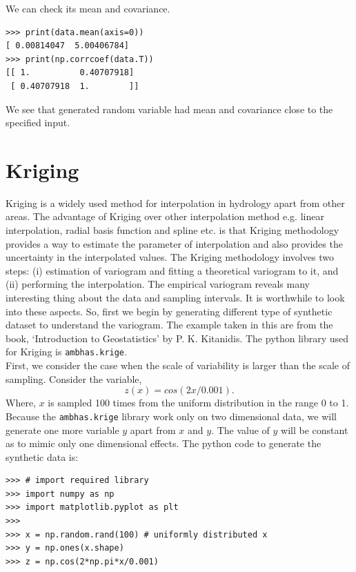 \documentclass[10pt]{book}
\begin{document}
We can check its mean and covariance.
\beforeverb \begin{verbatim}
>>> print(data.mean(axis=0))
[ 0.00814047  5.00406784]
>>> print(np.corrcoef(data.T))
[[ 1.          0.40707918]
 [ 0.40707918  1.        ]]
\end{verbatim} \afterverb
We see that generated random variable had mean and covariance close to the specified input. 


\section{Kriging}
Kriging is a widely used method for interpolation in hydrology apart from other areas. The advantage of Kriging over other interpolation method e.g. linear interpolation, radial basis function and  spline etc. is that Kriging methodology provides a way to estimate the parameter of interpolation and also provides the uncertainty in the interpolated values. The Kriging methodology involves two steps: (i) estimation of variogram and fitting a theoretical variogram to it, and (ii) performing the interpolation. The empirical variogram reveals many interesting thing about the data and sampling intervals. It is worthwhile to look into these aspects. So, first we begin by generating different type of synthetic dataset to understand the variogram. The example taken in this are from the book, `Introduction to Geostatistics' by P. K. Kitanidis. The python library used for Kriging is \verb"ambhas.krige".\\

First, we consider the case when the scale of variability is larger than the scale of sampling. Consider the variable,
\begin{equation}
z(x) = cos(2 x/0.001).
\end{equation}
Where, $x$ is sampled 100 times from the uniform distribution in the range 0 to 1. Because the \verb"ambhas.krige" library work only on two dimensional data, we will generate one more variable $y$ apart from $x$ and $y$. The value of $y$ will be constant as to mimic only one dimensional effects. The python code to generate the synthetic data is:

\beforeverb \begin{verbatim}
>>> # import required library
>>> import numpy as np
>>> import matplotlib.pyplot as plt
>>> 
>>> x = np.random.rand(100) # uniformly distributed x
>>> y = np.ones(x.shape) 
>>> z = np.cos(2*np.pi*x/0.001) 
\end{verbatim} \afterverb
\end{document}
